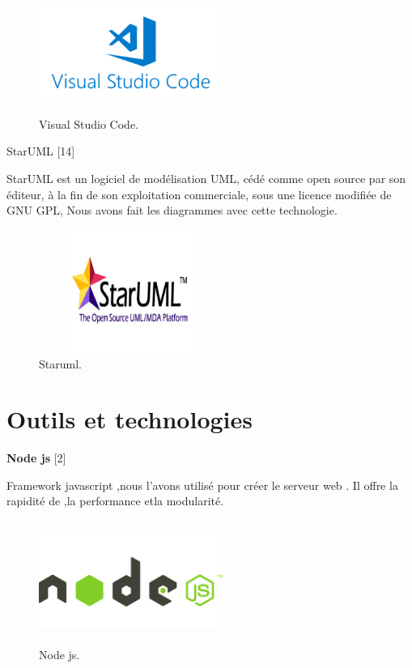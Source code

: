 \FloatBarrier
\begin{figure}[H]
\center
\includegraphics[width=6cm,height=4cm]{./figures/teklogos/vscode.png}
\caption{Visual Studio Code.}
\end{figure}
\FloatBarrier

\textbullet{}StarUML [14]

StarUML est un logiciel de mod\'{e}lisation UML, c\'{e}d\'{e} comme open source par son \'{e}diteur, \`{a} la
fin de son exploitation commerciale, sous une licence modifi\'{e}e de GNU GPL, Nous avons fait
les diagrammes avec cette technologie.


\FloatBarrier
\begin{figure}[H]
\center
\includegraphics[width=6cm,height=4cm]{./figures/teklogos/staruml.png}
\caption{Staruml.}
\end{figure}
\FloatBarrier


\section{Outils et technologies }

\textbf{ Node js} [2]

Framework javascript ,nous l'avons utilis\'{e} pour cr\'{e}er le serveur web .
Il offre la rapidit\'{e} de ,la performance etla modularit\'{e}.\newline

\FloatBarrier
\begin{figure}[H]
\center
\includegraphics[width=6cm,height=4cm]{./figures/teklogos/node.png}
\caption{Node js.}
\end{figure}
\FloatBarrier

